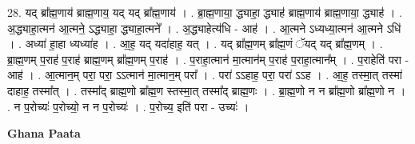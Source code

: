 \documentclass[17pt]{extarticle}
\begin{document}
28. यद् ब्रा᳚ह्म॒णाय॑ ब्राह्म॒णाय॒ यद् यद् ब्रा᳚ह्म॒णाय॑ । . ब्रा॒ह्म॒णाया॒ द्ध्याहा॒ द्ध्याह॑ ब्राह्म॒णाय॑ ब्राह्म॒णाया॒ द्ध्याह॑ । . अ॒द्ध्याहा॒त्मन॑ आ॒त्मने॒ ऽद्ध्याहा॒ द्ध्याहा॒त्मने᳚ । . अ॒द्ध्याहेत्य॑धि - आह॑ । . आ॒त्मने ऽध्यध्या॒त्मन॑ आ॒त्मने ऽधि॑ । . अध्या॑ हा॒हा ध्यध्या॑ह । . आ॒ह॒ यद् यदा॑हाह॒ यत् । . यद् ब्रा᳚ह्म॒णम् ब्रा᳚ह्म॒णं ॅयद् यद् ब्रा᳚ह्म॒णम् । . ब्रा॒ह्म॒णम् प॒राह॑ प॒राह॑ ब्राह्म॒णम् ब्रा᳚ह्म॒णम् प॒राह॑ । . प॒राहा॒त्मान॑ मा॒त्मान॑म् प॒राह॑ प॒राहा॒त्मान᳚म् । . प॒राहेति॑ परा - आह॑ । . आ॒त्मान॒म् परा॒ परा॒ ऽऽत्मान॑ मा॒त्मान॒म् परा᳚ । . परा॑ ऽऽहाह॒ परा॒ परा॑ ऽऽह । . आ॒ह॒ तस्मा॒त् तस्मा॑ दाहाह॒ तस्मा᳚त् । . तस्मा᳚द् ब्राह्म॒णो ब्रा᳚ह्म॒ण स्तस्मा॒त् तस्मा᳚द् ब्राह्म॒णः । . ब्रा॒ह्म॒णो न न ब्रा᳚ह्म॒णो ब्रा᳚ह्म॒णो न । . न प॒रोच्यः॑ प॒रोच्यो॒ न न प॒रोच्यः॑ । . प॒रोच्य॒ इति॑ परा - उच्यः॑ । \newline

\textbf{Ghana Paata } \newline
\end{document}
